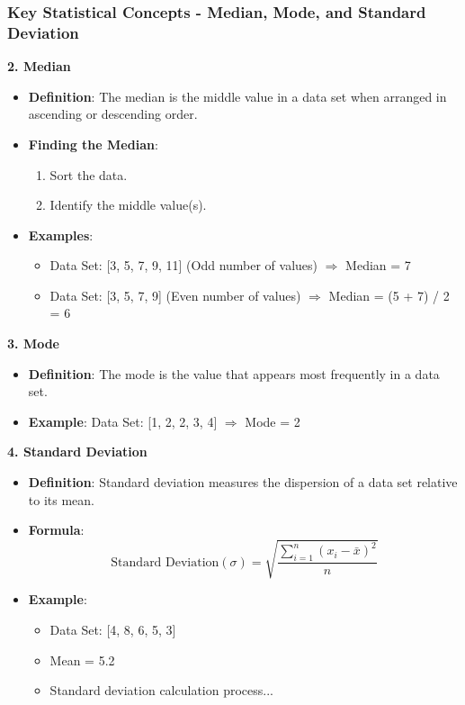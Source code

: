 \documentclass[aspectratio=169]{beamer}
\begin{document}
\begin{frame}[fragile]
    \frametitle{Key Statistical Concepts - Median, Mode, and Standard Deviation}
    \textbf{2. Median}
    
    \begin{itemize}
        \item \textbf{Definition}: The median is the middle value in a data set when arranged in ascending or descending order.
        \item \textbf{Finding the Median}:
        \begin{enumerate}
            \item Sort the data.
            \item Identify the middle value(s).
        \end{enumerate}
        \item \textbf{Examples}:
        \begin{itemize}
            \item Data Set: [3, 5, 7, 9, 11] (Odd number of values) $\Rightarrow$ Median = 7
            \item Data Set: [3, 5, 7, 9] (Even number of values) $\Rightarrow$ Median = (5 + 7) / 2 = 6
        \end{itemize}
    \end{itemize}

    \textbf{3. Mode}
    \begin{itemize}
        \item \textbf{Definition}: The mode is the value that appears most frequently in a data set.
        \item \textbf{Example}: Data Set: [1, 2, 2, 3, 4] $\Rightarrow$ Mode = 2
    \end{itemize}

    \textbf{4. Standard Deviation}
    \begin{itemize}
        \item \textbf{Definition}: Standard deviation measures the dispersion of a data set relative to its mean.
        \item \textbf{Formula}:
            \begin{equation}
            \text{Standard Deviation} (\sigma) = \sqrt{\frac{\sum_{i=1}^{n} (x_i - \bar{x})^2}{n}}
            \end{equation}
        \item \textbf{Example}:
            \begin{itemize}
                \item Data Set: [4, 8, 6, 5, 3]
                \item Mean = 5.2 
                \item Standard deviation calculation process...
            \end{itemize}
    \end{itemize}
\end{frame}
\end{document}
